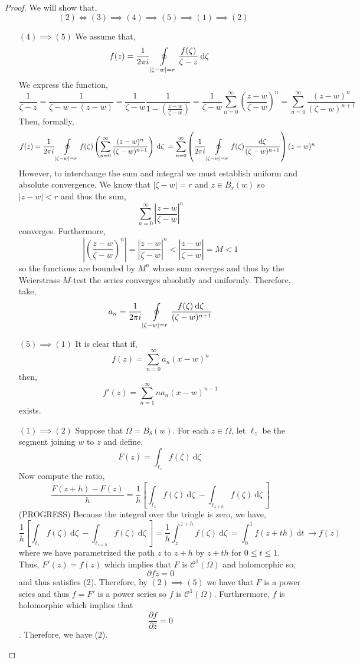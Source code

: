 \documentclass[12pt]{extarticle}
\renewcommand{\d}[1]{\: \mathrm{d}#1 \:}
\newcommand{\pderiv}[2]{\frac{\partial{#1}}{\partial{#2}}}
\theoremstyle{definition}
\newcommand{\Class}[2]{\mathcal{C}^{#1} \left( #2 \right)}
\begin{document}
\begin{proof}
We will show that,
\[ (2) \iff (3) \implies (4) \implies (5) \implies (1) \implies (2) \]
\begin{enumerate}
\item[$(4) \implies (5) $]
We assume that,
\[ f(z) = \frac{1}{2 \pi i} \oint\displaylimits_{|\zeta - w| = r} \frac{f(\zeta)}{\zeta - z} 
\d{\zeta} \]
We express the function,
\[ \frac{1}{\zeta - z} = \frac{1}{\zeta - w - (z - w)} = \frac{1}{\zeta - w} \frac{1}{1 - \left( \frac{z -w}{\zeta - w} \right)} = \frac{1}{\zeta - w} \sum_{n = 0}^\infty \left( \frac{z - w}{\zeta - w} \right)^n = \sum_{n = 0}^{\infty} \frac{(z - w)^n}{(\zeta - w)^{n+1}} \]
Then, formally,
\[ f(z) = \frac{1}{2 \pi i} \oint\displaylimits_{|\zeta - w| = r} f(\zeta) \left( \sum_{n = 0}^{\infty} \frac{(z - w)^n}{(\zeta - w)^{n+1}} \right) \d{\zeta} = \sum_{n = 0}^\infty \left( \frac{1}{2 \pi i} \oint\displaylimits_{|\zeta - w| = r} f(\zeta) \frac{\d{\zeta}}{(\zeta - w)^{n+1}} \right) (z - w)^n \]
However, to interchange the sum and integral we must establish uniform and absolute convergence. We know that $| \zeta - w | = r$ and $z \in B_r(w)$ so $|z - w| < r$ and thus the sum,
\[ \sum_{n = 0}^\infty \left| \frac{z - w}{\zeta - w} \right|^n  \]
converges. Furthermore, 
\[ \left| \left( \frac{z - w}{\zeta - w} \right)^n \right| = \left| \frac{z - w}{\zeta - w} \right|^n < \left| \frac{z - w}{\zeta - w} \right| = M < 1 \]
so the functions are bounded by $M^n$ whose sum coverges and thus by the Weierstrass $M$-test the series converges absolutly and uniformly. Therefore,
take,
\[ a_n = \frac{1}{2 \pi i} \oint\displaylimits_{|\zeta - w| = r} \frac{f(\zeta) \d{\zeta}}{(\zeta - w)^{n+1}} \]
\item[$(5) \implies (1)$]
It is clear that if,
\[ f(z) = \sum_{n = 0}^\infty a_n(x - w)^n \]
then,
\[ f'(z) = \sum_{n = 1}^\infty n a_n(x - w)^{n-1} \]
exists. 
\item[$(1) \implies (2)$]
Suppose that $\Omega = B_{\delta}(w)$. For each $z \in \Omega$, let $\ell_z$ be the segment joining $w$ to $z$ and define,
\[ F(z) = \int_{\ell_z} f(\zeta) \d{\zeta} \] 
Now compute the ratio,
\[ \frac{F(z + h) - F(z)}{h} = \frac{1}{h} \left[ \int_{\ell_z} f(\zeta) \d{\zeta} - \int_{\ell_{z + h}} f(\zeta) \d{\zeta} \right] \]
(PROGRESS)
Because the integral over the tringle is zero, we have,
\[ \frac{1}{h} \left[ \int_{\ell_z} f(\zeta) \d{\zeta} - \int_{\ell_{z + h}} f(\zeta) \d{\zeta} \right] = \frac{1}{h} \int_{z}^{z + h} f(\zeta) \d{\zeta} = \int_0^1 f(z + th) \d{t} \to f(z) \]
where we have parametrized the path $z$ to $z + h$ by $z + th$ for $0 \le t \le 1$. 
Thus, $F'(z) = f(z)$ which implies that $F$ is $\Class{1}{\Omega}$ and holomorphic so,
\[ \partial{f}{\bar{z}} = 0 \]
and thus satisfies (2). Therefore, by $(2) \implies (5)$ we have that $F$ is a power seies and thus $f = F'$ is a power series so $f$ is $\Class{1}{\Omega}$. Furthrermore, $f$ is holomorphic which implies that 
\[ \pderiv{f}{\bar{z}} = 0 \].
Therefore, we have (2). 
\end{enumerate}
\end{proof}
\end{document}
